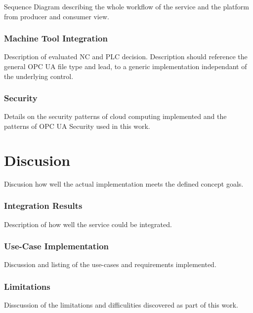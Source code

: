\documentclass[
a4paper,
twoside,
bibliography=totoc,
headsepline,
cleardoublepage=empty,
parskip=half,
draft=false
]{scrbook}
\begin{document}
				Sequence Diagram describing the whole workflow of the service and the platform from producer and consumer view.
				
			\subsection{Machine Tool Integration} \label{subsec:machine_tool_intergation}
			
				Description of evaluated NC and PLC decision. Description should reference the general OPC UA file type and lead, to a generic implementation independant of the underlying control.
				
			\subsection{Security} \label{subsec:security}
			
				Details on the security patterns of cloud computing implemented and the patterns of OPC UA Security used in this work.
				
	\chapter{Discusion} \label{ch:discusion}
	
		Discusion how well the actual implementation meets the defined concept goals.
		
		\subsection{Integration Results}\label{subsec:integration_results}
		
			Description of how well the service could be integrated.
			
		\subsection{Use-Case Implementation}\label{subsec:use_cases_implementation}
		
			Discussion and listing of the use-cases and requirements implemented.
			
		\subsection{Limitations}\label{subsec:limitations}
		
			Disscussion of the limitations and difficulities discovered as part of this work.
		
\end{document}
